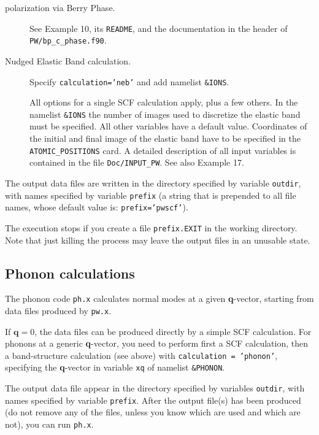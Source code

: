 \documentclass[12pt,a4paper]{article}
\begin{document}
\begin{description}
  \item [polarization via Berry Phase.]

    See Example 10, its \texttt{README}, and the documentation in the
    header of \texttt{PW/bp\_c\_phase.f90}.

  \item [Nudged Elastic Band calculation.]
    
    \hfill Specify \texttt{calculation='neb'} and add namelist
    \texttt{\&IONS}.

    All options for a single SCF calculation apply, plus a few others.
    In the namelist \texttt{\&IONS} the number of images used to
    discretize the elastic band must be specified.  All other
    variables have a default value.  Coordinates of the initial and
    final image of the elastic band have to be specified in the
    \texttt{ATOMIC\_POSITIONS} card.  A detailed description of all
    input variables is contained in the file \texttt{Doc/INPUT\_PW}.
    See also Example 17.

\end{description}

The output data files are written in the directory specified by
variable \texttt{outdir}, with names specified by variable
\texttt{prefix} (a string that is prepended to all file names,
whose default value is: \texttt{prefix='pwscf'}).

The execution stops if you create a file \texttt{prefix.EXIT} in the
working directory. Note that just killing the process may leave the
output files in an unusable state.

\subsection{Phonon calculations}

The phonon code \texttt{ph.x} calculates normal modes at a given
\textbf{q}-vector, starting from data files produced by \texttt{pw.x}.

If $\mathbf{q}=0$, the data files can be produced directly by a simple
SCF calculation.
For phonons at a generic \textbf{q}-vector, you need to perform first
a SCF calculation, then a band-structure calculation (see above)
with
\texttt{calculation = 'phonon'}, specifying the \textbf{q}-vector
in variable \texttt{xq} of namelist \texttt{\&PHONON}.

The output data file appear in the directory specified by variables
\texttt{outdir}, with names specified by variable \texttt{prefix}.
After the output file(s) has been produced (do not remove any of the
files, unless you know which are used and which are not), you can run
\texttt{ph.x}.
\end{document}
